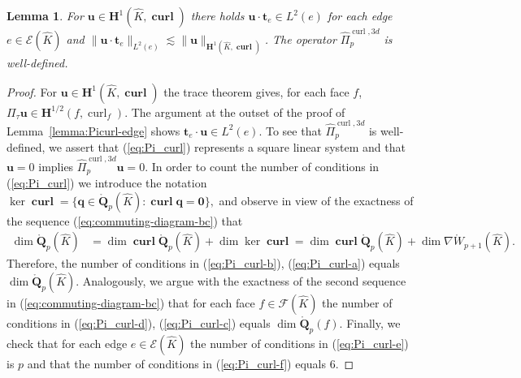 \documentclass{article}
\newtheorem{lemma}[theorem]{Lemma}
\newcommand{\hatPicurlcom}{\widehat \Pi^{\operatorname*{curl},3d}_p}
\begin{document}
\begin{lemma} 
\label{lemma:Pi_curl-well-defined}
For ${\mathbf u} \in {\mathbf H}^1(\widehat K,\operatorname{\mathbf{curl}})$ 
there holds ${\mathbf u} \cdot {\mathbf t}_e \in L^2(e)$ for each edge 
$e \in {\mathcal E}(\widehat K)$ and $\|{\mathbf u} \cdot {\mathbf t}_e\|_{L^2(e)} 
\lesssim \|{\mathbf u}\|_{{\mathbf H}^1(\widehat K,\operatorname{\mathbf{curl}})}$.  
The operator $\hatPicurlcom$ is well-defined. 
\end{lemma}
\begin{proof}
For ${\mathbf u} \in {\mathbf H}^1(\widehat K,\operatorname{\mathbf{curl}})$ 
the trace theorem gives, for each face $f$, 
$\Pi_\tau {\mathbf u} \in {\mathbf H}^{1/2}(f,\operatorname{curl}_f)$. 
The argument at the outset
of the proof of Lemma~\ref{lemma:Picurl-edge} shows 
${\mathbf t}_e \cdot {\mathbf  u} \in L^2(e)$. To see that 
$\hatPicurlcom$ is well-defined, we assert that (\ref{eq:Pi_curl}) represents
a square linear system and that ${\mathbf u} = 0$ implies $\hatPicurlcom {\mathbf u} = 0$. In order to count the number of conditions in (\ref{eq:Pi_curl}) 
we introduce the notation
$\displaystyle 
\operatorname{ker}\operatorname{\mathbf{curl}}=\{\mathbf{q}\in\mathring{\mathbf{Q}}_p(\widehat{K}):\operatorname{\mathbf{curl}}\mathbf{q}=\mathbf{0}\},
$
and observe 
in view of the exactness of the sequence (\ref{eq:commuting-diagram-bc}) that
\begin{align*}
\operatorname*{dim}\mathring{\mathbf{Q}}_{p}(\widehat{K})&=\operatorname*{dim}%
\operatorname*{\mathbf{curl}}\mathring{\mathbf{Q}}_{p}(\widehat{K})\!+\!\operatorname*{dim}%
\operatorname*{ker}\operatorname*{\mathbf{curl}}=\operatorname*{dim}\operatorname*{\mathbf{curl}}\mathring{\mathbf{Q}}%
_{p}(\widehat{K})+\operatorname*{dim}\nabla\mathring{W}_{p+1}(\widehat{K}).
\end{align*}
Therefore, 
the number of conditions in 
(\ref{eq:Pi_curl-b}), (\ref{eq:Pi_curl-a})  equals $\operatorname*{dim}%
\mathring{\mathbf{Q}}_{p}(\widehat{K})$.
Analogously, we argue with the exactness of the second sequence in
(\ref{eq:commuting-diagram-bc}) that for each face 
$f \in {\mathcal F}(\widehat K)$ 
the number of conditions in (\ref{eq:Pi_curl-d}), (\ref{eq:Pi_curl-c}) 
equals $\operatorname*{dim}%
\mathring{\mathbf{Q}}_{p}(f)$.
Finally, we check that for each edge $e \in {\mathcal E}(\widehat K)$
the number of conditions in (\ref{eq:Pi_curl-e}) is $p$
and that the number of conditions in (\ref{eq:Pi_curl-f}) equals $6$.

\end{proof}
\end{document}
